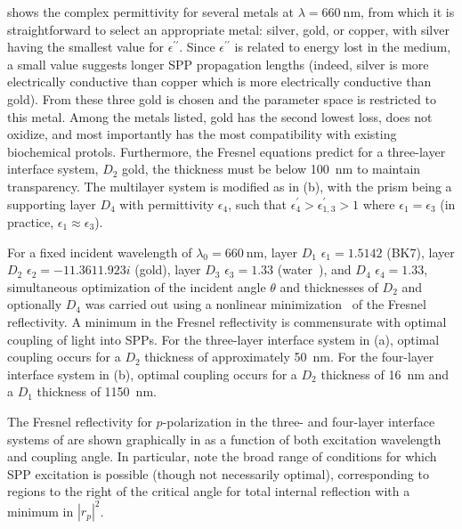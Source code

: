  shows the complex permittivity for several metals
at $\lambda=\SI{660}{\nano\meter}$, from which it is straightforward to
select an appropriate metal: silver, gold, or copper, with silver having
the smallest value for $\epsilon^{\prime\prime}$.  Since
$\epsilon^{\prime\prime}$ is related to energy lost in the medium, a small
value suggests longer SPP propagation lengths (indeed, silver is more
electrically conductive than copper which is more electrically conductive
than gold).  From these three gold is chosen and the parameter space is
restricted to this metal.  Among the metals listed, gold has the second
lowest loss, does not oxidize, and most importantly has the most
compatibility with existing biochemical protols.  Furthermore, the Fresnel
equations predict for a three-layer interface system, $D_2$ gold, the
thickness must be below \SI{100}{\nano\meter} to maintain transparency.
The multilayer system is modified as in (b),
with the prism being a supporting layer $D_4$ with permittivity
$\epsilon_4$, such that $\epsilon^\prime_4>\epsilon^\prime_{1,3}>1$ where
$\epsilon_1=\epsilon_3$ (in practice, $\epsilon_1\approx\epsilon_3$).

For a fixed incident wavelength of $\lambda_0=\SI{660}{\nano\meter}$, layer
$D_1$ $\epsilon_1=1.5142$ (BK7), layer $D_2$
$\epsilon_2=\num{-11.361+1.923i}$ (gold), layer $D_3$ $\epsilon_3=1.33$
(water~\cite{andreasson1971measurement}), and $D_4$ $\epsilon_4=1.33$,
simultaneous optimization of the incident angle $\theta$ and thicknesses of
$D_2$ and optionally $D_4$ was carried out using a nonlinear
minimization~\cite{brent1973algorithms} of the Fresnel reflectivity.  A
minimum in the Fresnel reflectivity is commensurate with optimal coupling
of light into SPPs.  For the three-layer interface system in
(a), optimal coupling occurs for a $D_2$
thickness of approximately \SI{50}{\nano\meter}.  For the four-layer
interface system in (b), optimal coupling
occurs for a $D_2$ thickness of \SI{16}{\nano\meter} and a $D_1$ thickness
of \SI{1150}{\nano\meter}.

The Fresnel reflectivity for $p$-polarization in the three- and four-layer
interface systems of  are shown graphically
in  as a function of both excitation wavelength
and coupling angle.  In particular, note the broad range of conditions for
which SPP excitation is possible (though not necessarily optimal),
corresponding to regions to the right of the critical angle for total
internal reflection with a minimum in $|r_p|^2$.

